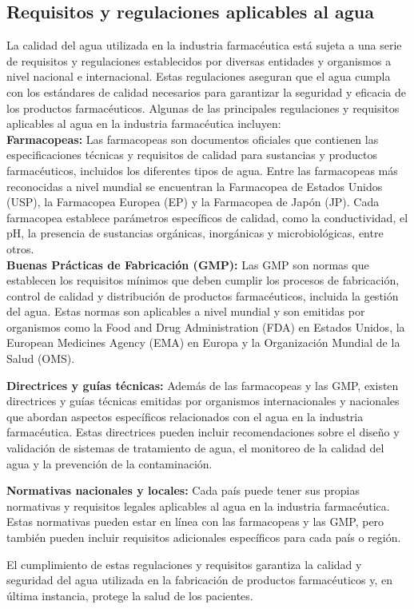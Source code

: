 \subsection{ Requisitos y regulaciones aplicables al agua}

La calidad del agua utilizada en la industria farmacéutica está sujeta a una serie de requisitos y regulaciones establecidos por diversas entidades y organismos a nivel nacional e internacional. Estas regulaciones aseguran que el agua cumpla con los estándares de calidad necesarios para garantizar la seguridad y eficacia de los productos farmacéuticos. Algunas de las principales regulaciones y requisitos aplicables al agua en la industria farmacéutica incluyen:\\

\textbf{Farmacopeas:} Las farmacopeas son documentos oficiales que contienen las especificaciones técnicas y requisitos de calidad para sustancias y productos farmacéuticos, incluidos los diferentes tipos de agua. Entre las farmacopeas más reconocidas a nivel mundial se encuentran la Farmacopea de Estados Unidos (USP), la Farmacopea Europea (EP) y la Farmacopea de Japón (JP). Cada farmacopea establece parámetros específicos de calidad, como la conductividad, el pH, la presencia de sustancias orgánicas, inorgánicas y microbiológicas, entre otros. \\

\textbf{ Buenas Prácticas de Fabricación (GMP):} Las GMP son normas que establecen los requisitos mínimos que deben cumplir
los procesos de fabricación, control de calidad y distribución de productos farmacéuticos, incluida la gestión del agua.
Estas normas son aplicables a nivel mundial y son emitidas por organismos como la Food and Drug Administration (FDA) en Estados Unidos, la European Medicines Agency (EMA) en Europa y la Organización Mundial de la Salud (OMS).

\textbf{ Directrices y guías técnicas:} Además de las farmacopeas y las GMP, existen directrices y guías técnicas emitidas por organismos internacionales y nacionales que abordan aspectos específicos relacionados con el agua en la industria farmacéutica. Estas directrices pueden incluir recomendaciones sobre el diseño y validación de sistemas de tratamiento de agua, el monitoreo de la calidad del agua y la prevención de la contaminación.

\textbf{ Normativas nacionales y locales:} Cada país puede tener sus propias normativas y requisitos legales aplicables al agua en la industria farmacéutica. Estas normativas pueden estar en línea con las farmacopeas y las GMP, pero también pueden incluir requisitos adicionales específicos para cada país o región.


El cumplimiento de estas regulaciones y requisitos garantiza la calidad y seguridad del agua utilizada en la fabricación de productos farmacéuticos y, en última instancia, protege la salud de los pacientes.
